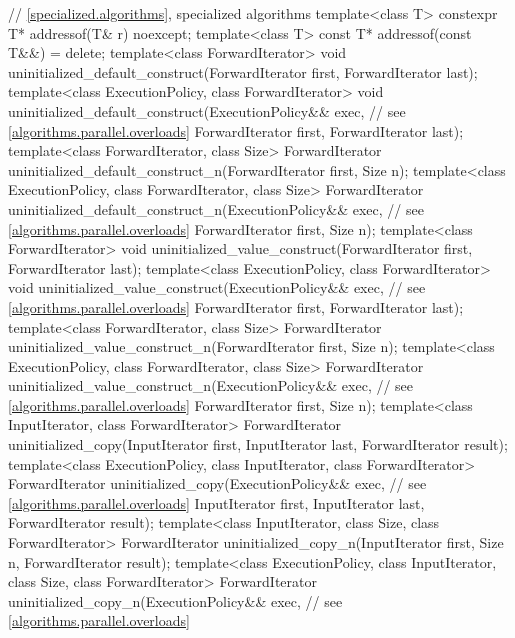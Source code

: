 \begin{codeblock}
{  // \ref{specialized.algorithms}, specialized algorithms
  template<class T>
    constexpr T* addressof(T& r) noexcept;
  template<class T>
    const T* addressof(const T&&) = delete;
  template<class ForwardIterator>
    void uninitialized_default_construct(ForwardIterator first, ForwardIterator last);
  template<class ExecutionPolicy, class ForwardIterator>
    void uninitialized_default_construct(ExecutionPolicy&& exec, // see \ref{algorithms.parallel.overloads}
                                         ForwardIterator first, ForwardIterator last);
  template<class ForwardIterator, class Size>
    ForwardIterator uninitialized_default_construct_n(ForwardIterator first, Size n);
  template<class ExecutionPolicy, class ForwardIterator, class Size>
    ForwardIterator uninitialized_default_construct_n(ExecutionPolicy&& exec, // see \ref{algorithms.parallel.overloads}
                                                      ForwardIterator first, Size n);
  template<class ForwardIterator>
    void uninitialized_value_construct(ForwardIterator first, ForwardIterator last);
  template<class ExecutionPolicy, class ForwardIterator>
    void uninitialized_value_construct(ExecutionPolicy&& exec, // see \ref{algorithms.parallel.overloads}
                                       ForwardIterator first, ForwardIterator last);
  template<class ForwardIterator, class Size>
    ForwardIterator uninitialized_value_construct_n(ForwardIterator first, Size n);
  template<class ExecutionPolicy, class ForwardIterator, class Size>
    ForwardIterator uninitialized_value_construct_n(ExecutionPolicy&& exec, // see \ref{algorithms.parallel.overloads}
                                                    ForwardIterator first, Size n);
  template<class InputIterator, class ForwardIterator>
    ForwardIterator uninitialized_copy(InputIterator first, InputIterator last,
                                       ForwardIterator result);
  template<class ExecutionPolicy, class InputIterator, class ForwardIterator>
    ForwardIterator uninitialized_copy(ExecutionPolicy&& exec, // see \ref{algorithms.parallel.overloads}
                                       InputIterator first, InputIterator last,
                                       ForwardIterator result);
  template<class InputIterator, class Size, class ForwardIterator>
    ForwardIterator uninitialized_copy_n(InputIterator first, Size n,
                                         ForwardIterator result);
  template<class ExecutionPolicy, class InputIterator, class Size, class ForwardIterator>
    ForwardIterator uninitialized_copy_n(ExecutionPolicy&& exec, // see \ref{algorithms.parallel.overloads}
}
\end{codeblock}
